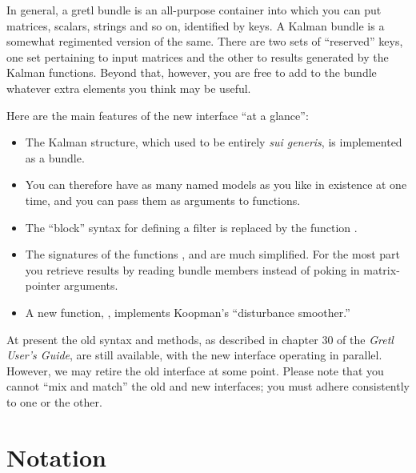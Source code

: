 \documentclass[a4paper]{article}
\begin{document}
In general, a gretl bundle is an all-purpose container into which you
can put matrices, scalars, strings and so on, identified by keys. A
Kalman bundle is a somewhat regimented version of the same. There are
two sets of ``reserved'' keys, one set pertaining to input matrices
and the other to results generated by the Kalman functions.  Beyond
that, however, you are free to add to the bundle whatever extra
elements you think may be useful.

Here are the main features of the new interface ``at a glance'':
%
\begin{itemize}
\item The Kalman structure, which used to be entirely \textit{sui
    generis}, is implemented as a bundle.
\item You can therefore have as many named models as you like in
  existence at one time, and you can pass them as arguments to
  functions.
\item The ``block'' syntax for defining a filter is replaced by the
  function .
\item The signatures of the functions ,
   and  are much simplified. For the
  most part you retrieve results by reading bundle members instead of
  poking in matrix-pointer arguments.
\item A new function, , implements Koopman's
  ``disturbance smoother.''
\end{itemize}

At present the old syntax and methods, as described in chapter 30 of
the \textit{Gretl User's Guide}, are still available, with the new
interface operating in parallel. However, we may retire the old
interface at some point. Please note that you cannot ``mix and match''
the old and new interfaces; you must adhere consistently to one or the
other.

\section{Notation}
\end{document}
